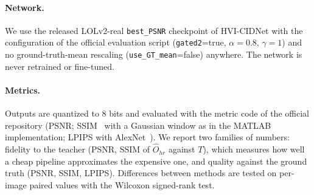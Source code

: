 \documentclass[runningheads]{llncs}
\begin{document}
\paragraph{Network.} We use the released LOLv2-real \texttt{best\_PSNR} checkpoint of HVI-CIDNet with the configuration of the official evaluation script (\texttt{gated2}=true, $\alpha=0.8$, $\gamma=1$) and no ground-truth-mean rescaling (\texttt{use\_GT\_mean}=false) anywhere. The network is never retrained or fine-tuned.

\paragraph{Metrics.} Outputs are quantized to 8 bits and evaluated with the metric code of the official repository (PSNR; SSIM~\cite{ssim} with a Gaussian window as in the MATLAB implementation; LPIPS with AlexNet~\cite{lpips}). We report two families of numbers: fidelity to the teacher (PSNR, SSIM of $\hat O_{hr}$ against $T$), which measures how well a cheap pipeline approximates the expensive one, and quality against the ground truth (PSNR, SSIM, LPIPS). Differences between methods are tested on per-image paired values with the Wilcoxon signed-rank test.
\end{document}
